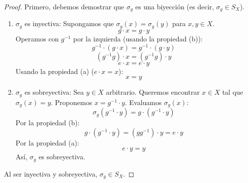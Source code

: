 \begin{proof}
    Primero, debemos demostrar que $\sigma_g$ es una biyección (es decir, $\sigma_g \in S_X$).
    \begin{enumerate}
        \item[1.] $\sigma_g$ es inyectiva:
        Supongamos que $\sigma_g(x) = \sigma_g(y)$ para $x, y \in X$.
        \begin{equation*}
            g \cdot x = g \cdot y
        \end{equation*}
        Operamos con $g^{-1}$ por la izquierda (usando la propiedad (b)):
        \begin{equation*}
            g^{-1} \cdot (g \cdot x) = g^{-1} \cdot (g \cdot y)
        \end{equation*}
        \begin{equation*}
            (g^{-1}g) \cdot x = (g^{-1}g) \cdot y
        \end{equation*}
        \begin{equation*}
            e \cdot x = e \cdot y
        \end{equation*}
        Usando la propiedad (a) ($e \cdot x = x$):
        \begin{equation*}
            x = y
        \end{equation*}
        
        \item[2.] $\sigma_g$ es sobreyectiva:
        Sea $y \in X$ arbitrario. Queremos encontrar $x \in X$ tal que $\sigma_g(x) = y$.
        Proponemos $x = g^{-1} \cdot y$.
        Evaluamos $\sigma_g(x)$:
        \begin{equation*}
            \sigma_g(g^{-1} \cdot y) = g \cdot (g^{-1} \cdot y)
        \end{equation*}
        Por la propiedad (b):
        \begin{equation*}
            g \cdot (g^{-1} \cdot y) = (gg^{-1}) \cdot y = e \cdot y
        \end{equation*}
        Por la propiedad (a):
        \begin{equation*}
            e \cdot y = y
        \end{equation*}
        Así, $\sigma_g$ es sobreyectiva.
    \end{enumerate}
    Al ser inyectiva y sobreyectiva, $\sigma_g \in S_X$.
    

\end{proof}
